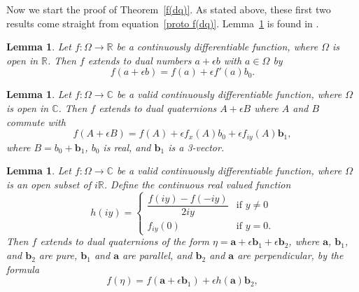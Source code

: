 \documentclass[12pt,reqno]{amsart}
\newtheorem{lemma}[theorem]{Lemma}
\begin{document}
Now we start the proof of Theorem~\ref{f(dq)}.  As stated above, these first two results come straight from equation~\eqref{proto f(dq)}.  Lemma~\ref{f(d)} is found in \cite{wiki-1}.

\begin{lemma}
\label{f(d)}
Let $f:\Omega \to \mathbb R$ be a continuously differentiable function, where $\Omega$ is open in $\mathbb R$.  Then $f$ extends to dual numbers $a + \epsilon b$ with $a \in \Omega$ by
\begin{equation}
\label{dual number case}
f(a + \epsilon b ) = f(a) + \epsilon f'(a) b_0 .
\end{equation}
\end{lemma}

\begin{lemma}
\label{f(dq) commute}
Let $f:\Omega \to \mathbb C$ be a valid continuously differentiable function, where $\Omega$ is open in $\mathbb C$.  Then $f$ extends to dual quaternions $A + \epsilon B$ where $A$ and $B$ commute with
\begin{equation}
\label{commuting case}
f(A + \epsilon B ) = f(A) + \epsilon f_x(A) b_0
+ \epsilon f_{iy}(A) \bm b_1 ,
\end{equation}
where $B = b_0 + \bm b_1$, $b_0$ is real, and $\bm b_1$ is a 3-vector.
\end{lemma}

\begin{lemma}
\label{f(dq) anti commute}
Let $f:\Omega \to \mathbb C$ be a valid continuously differentiable function, where $\Omega$ is an open subset of $i\mathbb R$.  Define the continuous real valued function
\begin{equation}
\label{h ident 2}
h(iy) = \begin{cases}
\dfrac{f(iy) - f(-iy)}{2iy} &\text{if $y \ne 0$} \\
f_{iy}(0) &\text{if $y = 0$} .
\end{cases}
\end{equation}
Then $f$ extends to dual quaternions of the form $\eta = \bm a + \epsilon \bm b_1 + \epsilon \bm b_2$, where $\bm a$, $\bm b_1$, and $\bm b_2$ are pure, $\bm b_1$ and $\bm a$ are parallel, and $\bm b_2$ and $\bm a$ are perpendicular, by the formula
\begin{equation}
\label{f(dq) anti commute equ}
f(\eta) = f(\bm a + \epsilon \bm b_1) + \epsilon h(\bm a) \bm b_2 ,
\end{equation}
\end{lemma}
\end{document}
